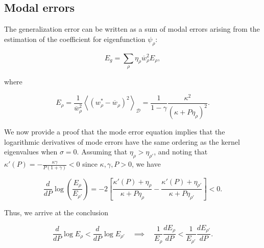 \documentclass[11pt]{article}
\begin{document}
\subsection*{Modal errors}

The generalization error can be written as a sum of modal errors arising from the estimation of the coefficient for eigenfunction $\psi_\rho$:
\begin{linenomath*}\begin{equation} 
E_g = \sum_\rho \eta_\rho \overline{w}_\rho^2 E_\rho,
\end{equation}\end{linenomath*}
where
\begin{linenomath*}\begin{equation}
E_\rho = \frac{1}{\overline{w}_\rho^2} \left< ( {w}^*_\rho - \overline{w}_\rho)^2 \right>_{\mathcal D} = \frac{1}{1-\gamma} \frac{\kappa^2 }{(\kappa+P\eta_\rho)^2} .
\end{equation}\end{linenomath*}
%
We now provide a proof that the mode error equation implies that the logarithmic derivatives of mode errors have the same ordering as the kernel eigenvalues when $\sigma=0$. Assuming that $\eta_\rho > \eta_{\rho'}$, and noting that $ \kappa'(P) = - \frac{\kappa \gamma}{P(1 + \gamma)} < 0$ since $\kappa, \gamma, P > 0$, we have
%
\begin{linenomath*}\begin{equation}
    \frac{d}{dP} \log \left( \frac{E_\rho}{E_{\rho'}} \right)  = - 2 \left[ \frac{\kappa'(P) + \eta_\rho}{\kappa+P\eta_\rho} - \frac{\kappa'(P) + \eta_{\rho'}}{\kappa + P\eta_{\rho'}} \right] <0.
\end{equation}\end{linenomath*} 
Thus, we arrive at the conclusion
\begin{linenomath*}\begin{equation}
    \frac{d}{dP} \log E_\rho  < \frac{d}{dP} \log E_{\rho'} \quad \implies \quad 
    \frac{1}{E_\rho} \frac{dE_\rho}{dP} < \frac{1}{E_{\rho'}} \frac{d E_{\rho'}}{dP}.
\end{equation}\end{linenomath*}
%
\end{document}
